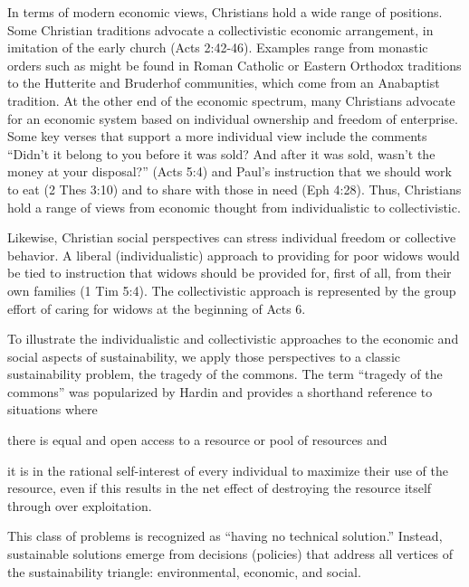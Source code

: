 \documentclass[12pt]{article}
\begin{document}
In terms of modern economic views, Christians hold a wide range of positions. 
Some Christian traditions advocate a
collectivistic economic arrangement, in imitation of the early church (Acts 2:42-46). 
Examples range from monastic orders such as
might be found in Roman Catholic or Eastern Orthodox traditions 
to the Hutterite and Bruderhof communities, 
which come from an Anabaptist tradition. 
At the other end of the economic spectrum, many Christians advocate for an economic system
based on individual ownership and freedom of enterprise. 
Some key verses that support a more individual view include the comments 
``Didn’t it belong to you before it was sold? And after it was sold, 
wasn’t the money at your disposal?'' (Acts 5:4) and 
Paul's instruction that we should work to eat (2 Thes 3:10) and to share with those in need (Eph 4:28).
Thus, Christians hold a range of views from economic thought from individualistic to collectivistic.

Likewise, Christian social perspectives can stress individual freedom or collective behavior.
A liberal (individualistic) approach to providing for poor widows 
would be tied to instruction that widows should be 
provided for, first of all, from their own families (1 Tim 5:4). 
The collectivistic approach is represented by the group effort of caring for widows 
at the beginning of Acts 6.

To illustrate the individualistic and collectivistic approaches to the economic and social 
aspects of sustainability, 
we apply those perspectives to a classic sustainability problem, 
the tragedy of the commons. 
The term ``tragedy of the commons'' was popularized by Hardin \autocite{Hardin68} 
and provides a shorthand reference to situations where 
%
\begin{enumerate*}[label={(\alph*)}]

  \item there is equal and open access to a resource or pool of resources and

  \item it is in the rational self-interest of
		every individual to maximize their use of the resource, even if this results in the net effect of destroying the
		resource itself through over exploitation.

\end{enumerate*}
% 
This class of problems is recognized as ``having no technical solution.''
Instead, sustainable solutions emerge from decisions (policies) 
that address all vertices of the sustainability triangle:
environmental, economic, and social.
\end{document}
